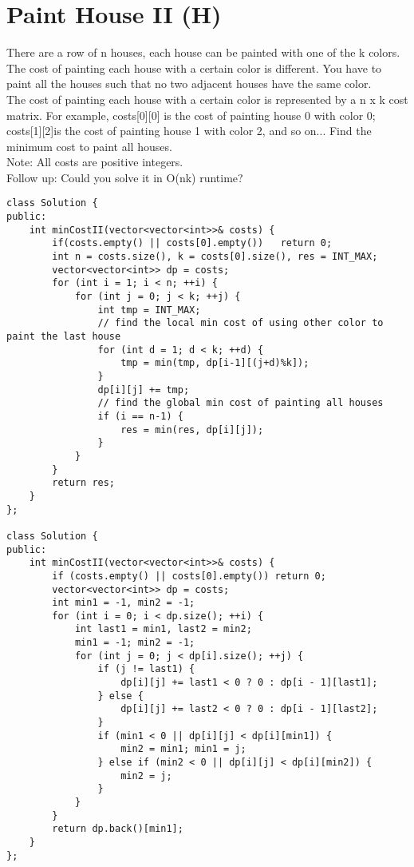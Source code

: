 \section{Paint House II (H)}
There are a row of n houses, each house can be painted with one of the k colors. The cost of painting each house with a certain color is different. You have to paint all the houses such that no two adjacent houses have the same color.\\

The cost of painting each house with a certain color is represented by a n x k cost matrix. For example, costs[0][0] is the cost of painting house 0 with color 0; costs[1][2]is the cost of painting house 1 with color 2, and so on... Find the minimum cost to paint all houses.\\

Note:
All costs are positive integers.\\

Follow up:
Could you solve it in O(nk) runtime?\\

\begin{lstlisting}
class Solution {
public:
    int minCostII(vector<vector<int>>& costs) {
        if(costs.empty() || costs[0].empty())   return 0;
        int n = costs.size(), k = costs[0].size(), res = INT_MAX;
        vector<vector<int>> dp = costs;
        for (int i = 1; i < n; ++i) {
            for (int j = 0; j < k; ++j) {
                int tmp = INT_MAX;
                // find the local min cost of using other color to paint the last house
                for (int d = 1; d < k; ++d) {
                    tmp = min(tmp, dp[i-1][(j+d)%k]);
                }
                dp[i][j] += tmp;
                // find the global min cost of painting all houses
                if (i == n-1) {
                    res = min(res, dp[i][j]);
                }
            }
        }
        return res;
    }
};

class Solution {
public:
    int minCostII(vector<vector<int>>& costs) {
        if (costs.empty() || costs[0].empty()) return 0;
        vector<vector<int>> dp = costs;
        int min1 = -1, min2 = -1;
        for (int i = 0; i < dp.size(); ++i) {
            int last1 = min1, last2 = min2;
            min1 = -1; min2 = -1;
            for (int j = 0; j < dp[i].size(); ++j) {
                if (j != last1) {
                    dp[i][j] += last1 < 0 ? 0 : dp[i - 1][last1];
                } else {
                    dp[i][j] += last2 < 0 ? 0 : dp[i - 1][last2];
                }
                if (min1 < 0 || dp[i][j] < dp[i][min1]) {
                    min2 = min1; min1 = j;
                } else if (min2 < 0 || dp[i][j] < dp[i][min2]) {
                    min2 = j;
                }
            }
        }
        return dp.back()[min1];
    }
};
\end{lstlisting}


